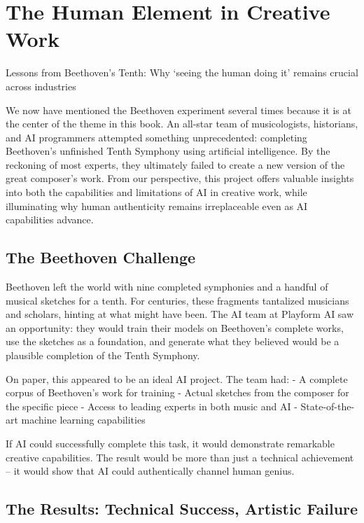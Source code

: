 \documentclass[
  Letterpaper,
]{scrbook}
\begin{document}

\chapter{The Human Element in Creative
Work}\label{the-human-element-in-creative-work}

Lessons from Beethoven's Tenth: Why `seeing the human doing it' remains
crucial across industries

\hfill\break

We now have mentioned the Beethoven experiment several times because it
is at the center of the theme in this book. An all-star team of
musicologists, historians, and AI programmers attempted something
unprecedented: completing Beethoven's unfinished Tenth Symphony using
artificial intelligence. By the reckoning of most experts, they
ultimately failed to create a new version of the great composer's work.
From our perspective, this project offers valuable insights into both
the capabilities and limitations of AI in creative work, while
illuminating why human authenticity remains irreplaceable even as AI
capabilities advance.

\section{The Beethoven Challenge}\label{the-beethoven-challenge}

Beethoven left the world with nine completed symphonies and a handful of
musical sketches for a tenth. For centuries, these fragments tantalized
musicians and scholars, hinting at what might have been. The AI team at
Playform AI saw an opportunity: they would train their models on
Beethoven's complete works, use the sketches as a foundation, and
generate what they believed would be a plausible completion of the Tenth
Symphony.

On paper, this appeared to be an ideal AI project. The team had: - A
complete corpus of Beethoven's work for training - Actual sketches from
the composer for the specific piece - Access to leading experts in both
music and AI - State-of-the-art machine learning capabilities

If AI could successfully complete this task, it would demonstrate
remarkable creative capabilities. The result would be more than just a
technical achievement -- it would show that AI could authentically
channel human genius.

\section{The Results: Technical Success, Artistic
Failure}\label{the-results-technical-success-artistic-failure}
\end{document}
